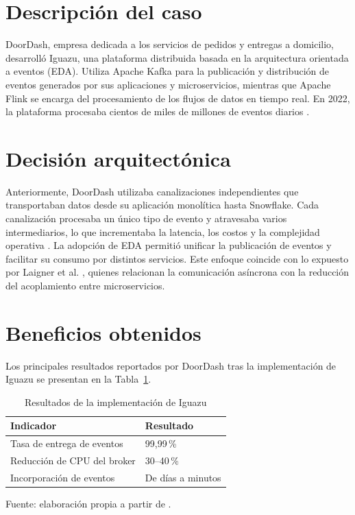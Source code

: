 \section{Descripción del caso}

DoorDash, empresa dedicada a los servicios de pedidos y entregas a domicilio, desarrolló Iguazu, una plataforma distribuida basada en la arquitectura orientada a eventos (EDA). Utiliza Apache Kafka para la publicación y distribución de eventos generados por sus aplicaciones y microservicios, mientras que Apache Flink se encarga del procesamiento de los flujos de datos en tiempo real. En 2022, la plataforma procesaba cientos de miles de millones de eventos diarios \cite{wang2022iguazu}.

\section{Decisión arquitectónica}

Anteriormente, DoorDash utilizaba canalizaciones independientes que transportaban datos desde su aplicación monolítica hasta Snowflake. Cada canalización procesaba un único tipo de evento y atravesaba varios intermediarios, lo que incrementaba la latencia, los costos y la complejidad operativa \cite{wang2022iguazu}. La adopción de EDA permitió unificar la publicación de eventos y facilitar su consumo por distintos servicios. Este enfoque coincide con lo expuesto por Laigner et al. \cite{laigner2026events}, quienes relacionan la comunicación asíncrona con la reducción del acoplamiento entre microservicios.

\section{Beneficios obtenidos}

Los principales resultados reportados por DoorDash tras la implementación de Iguazu se presentan en la Tabla~\ref{tab:resultados}.

\begin{table}[H]
    \centering
    \caption{Resultados de la implementación de Iguazu}
    \label{tab:resultados}
    \small
    \begin{tabularx}{\textwidth}{X l}
        \toprule
        \textbf{Indicador} & \textbf{Resultado} \\
        \midrule
        Tasa de entrega de eventos & 99,99\,\% \\
        Reducción de CPU del broker & 30--40\,\% \\
        Incorporación de eventos & De días a minutos \\
        \bottomrule
    \end{tabularx}

    \vspace{2pt}
    {\footnotesize Fuente: elaboración propia a partir
    de \cite{wang2022iguazu}.}
\end{table}

